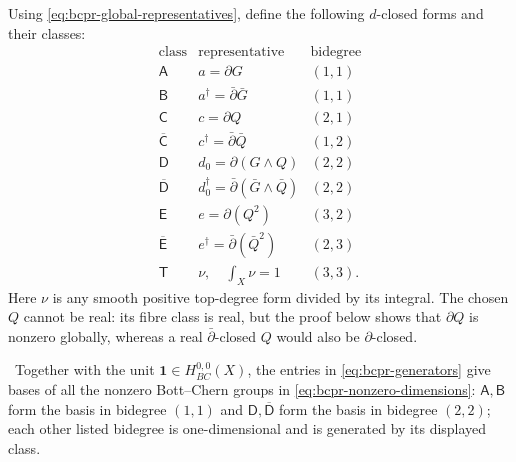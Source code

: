 Using \cref{eq:bcpr-global-representatives}, define the following
$d$-closed forms and their classes:
\begin{equation}
\begin{array}{c|c|c}
\text{class}&\text{representative}&\text{bidegree}\\ \hline
\mathsf A&a=\partial G&(1,1)\\
\mathsf B&a^\dagger=\bar\partial\bar G&(1,1)\\
\mathsf C&c=\partial Q&(2,1)\\
\overline{\mathsf C}&c^\dagger=\bar\partial\bar Q&(1,2)\\
\mathsf D&d_0=\partial(G\wedge Q)&(2,2)\\
\overline{\mathsf D}&d_0^\dagger=
 \bar\partial(\bar G\wedge\bar Q)&(2,2)\\
\mathsf E&e=\partial(Q^2)&(3,2)\\
\overline{\mathsf E}&e^\dagger=\bar\partial(\bar Q^2)&(2,3)\\
\mathsf T&\nu,\quad\int_X\nu=1&(3,3).
\end{array}
\label{eq:bcpr-generators}
\end{equation}
Here $\nu$ is any smooth positive top-degree form divided by its integral.
The chosen $Q$ cannot be real: its fibre class is real, but the proof below
shows that $\partial Q$ is nonzero globally, whereas a real
$\bar\partial$-closed $Q$ would also be $\partial$-closed.

\begin{proposition}
\label{prop:bcpr-generators-are-bases}
\Verified\ Together with the unit $\mathbf1\in H^{0,0}_{BC}(X)$, the entries
in \cref{eq:bcpr-generators} give bases of all the nonzero Bott--Chern groups
in \cref{eq:bcpr-nonzero-dimensions}:
$\mathsf A,\mathsf B$ form the basis in bidegree $(1,1)$ and
$\mathsf D,\overline{\mathsf D}$ form the basis in bidegree $(2,2)$;
each other listed bidegree is one-dimensional and is generated by its
displayed class.
\end{proposition}

